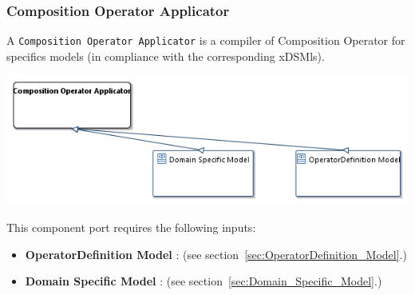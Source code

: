 \documentclass{gemoc} %
\begin{document}
\subsubsection{Composition Operator Applicator}
\label{sec:Composition_Operator_Applicator}
A \texttt{Composition Operator Applicator} is a compiler of Composition Operator for specifics models (in compliance with the corresponding xDSMls).
\begin{center}
\includegraphics*[trim=0.0cm 0.0cm 0cm 0.0cm, clip=true]{../images/generated/Generated_Composition_Operator_Applicator.png}
\end{center}

This component port requires the following inputs:
\begin{itemize}
  \item \textbf{OperatorDefinition Model} :
(see section~\ref{sec:OperatorDefinition_Model}.)
  \item \textbf{Domain Specific Model} :
(see section~\ref{sec:Domain_Specific_Model}.)
\end{itemize}
\end{document}
